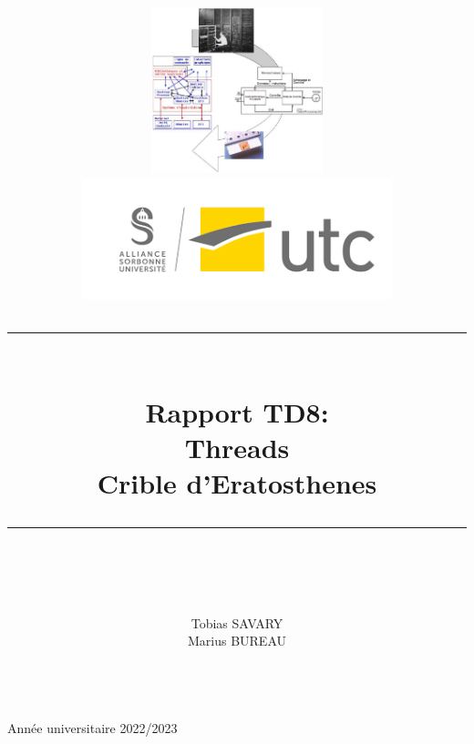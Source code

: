\documentclass[
    ]{article}
\newcommand{\HRule}[1]{\rule{\linewidth}{#1}}
\begin{document}
\title{ 
   \begin{center}
           \includegraphics[width=5cm]{img/SR02.jpg} \hspace*{1cm}
           \includegraphics[width=9cm]{img/logo_UTC.png} \\ [2cm]
   \end{center}
		\HRule{2pt} \\

		\LARGE \textbf{Rapport TD8:\\Threads \\ Crible d’Eratosthenes} 
		\HRule{2pt} \\ [5.5cm]


		\normalsize  
        \author{
            Tobias SAVARY \\[0.5cm]
            Marius BUREAU \\[0.5cm]
           \\[1cm]
        }
		}
		\maketitle
        \begin{center}
            Année universitaire 2022/2023
        \end{center}
\pagebreak

\tableofcontents

\pagebreak

\end{document}
